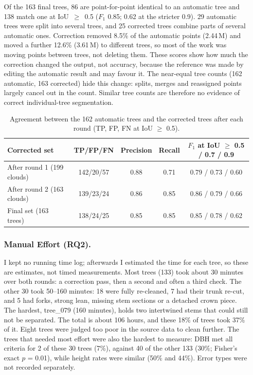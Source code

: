 \documentclass[runningheads]{llncs}
\begin{document}
Of the 163 final trees, 86 are point-for-point identical to an automatic tree and 138 match one at IoU~$\geq$~0.5 ($F_1$ 0.85; 0.62 at the stricter 0.9). 29 automatic trees were split into several trees, and 25 corrected trees combine parts of several automatic ones. Correction removed 8.5\% of the automatic points (2.44\,M) and moved a further 12.6\% (3.61\,M) to different trees, so most of the work was moving points between trees, not deleting them. These scores show how much the correction changed the output, not accuracy, because the reference was made by editing the automatic result and may favour it. The near-equal tree counts (162 automatic, 163 corrected) hide this change: splits, merges and reassigned points largely cancel out in the count. Similar tree counts are therefore no evidence of correct individual-tree segmentation.

\begin{table}[!tb]
\caption{Agreement between the 162 automatic trees and the corrected trees after each round (TP, FP, FN at IoU $\ge$ 0.5).}\label{tab:rq1}
\centering\footnotesize
\begin{tabular}{@{}lcccc@{}}
\toprule
Corrected set & TP/FP/FN & Precision & Recall & $F_1$ at IoU $\ge$ 0.5 / 0.7 / 0.9\\
\midrule
After round 1 (199 clouds) & 142/20/57 & 0.88 & 0.71 & 0.79 / 0.73 / 0.60\\
After round 2 (163 clouds) & 139/23/24 & 0.86 & 0.85 & 0.86 / 0.79 / 0.66\\
Final set (163 trees) & 138/24/25 & 0.85 & 0.85 & 0.85 / 0.78 / 0.62\\
\bottomrule
\end{tabular}
\end{table}

\subsubsection{Manual Effort (RQ2).}
I kept no running time log; afterwards I estimated the time for each tree, so these are estimates, not timed measurements. Most trees (133) took about 30 minutes over both rounds: a correction pass, then a second and often a third check. The other 30 took 50--160 minutes: 18 were fully re-cleaned, 7 had their trunk re-cut, and 5 had forks, strong lean, missing stem sections or a detached crown piece. The hardest, tree\_079 (160 minutes), holds two intertwined stems that could still not be separated. The total is about 106 hours, and these 18\% of trees took 37\% of it. Eight trees were judged too poor in the source data to clean further. The trees that needed most effort were also the hardest to measure: DBH met all criteria for 2 of these 30 trees (7\%), against 40 of the other 133 (30\%; Fisher's exact $p$ = 0.01), while height rates were similar (50\% and 44\%). Error types were not recorded separately.
\end{document}

